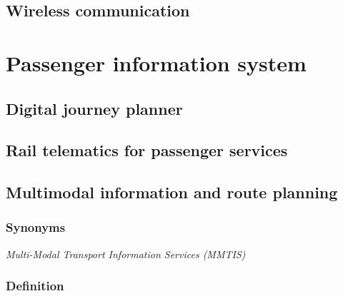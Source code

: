 \documentclass[
]{book}
\begin{document}
\hypertarget{wireless-communication}{%
\section{Wireless communication}\label{wireless-communication}}

\hypertarget{passenger}{%
\chapter{Passenger information system}\label{passenger}}

\hypertarget{digital-journey-planner}{%
\section{Digital journey planner}\label{digital-journey-planner}}

\hypertarget{telematics_passenger}{%
\section{Rail telematics for passenger services}\label{telematics_passenger}}

\hypertarget{multimodal-information-and-route-planning}{%
\section{Multimodal information and route planning}\label{multimodal-information-and-route-planning}}

\hypertarget{synonyms-9}{%
\subsection*{Synonyms}\label{synonyms-9}}

\emph{Multi-Modal Transport Information Services (MMTIS)}

\hypertarget{definition-9}{%
\subsection*{Definition}\label{definition-9}}
\end{document}
